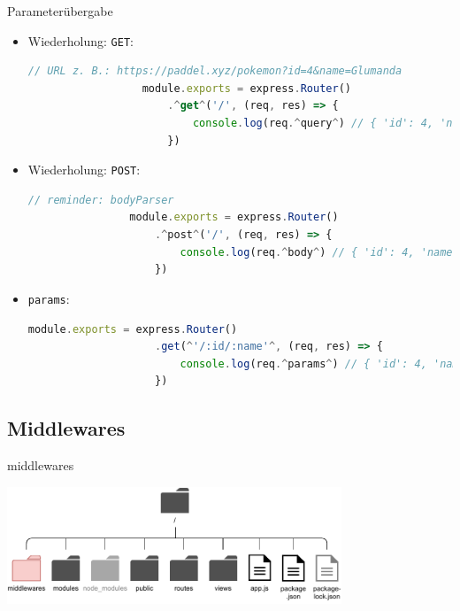 \begin{bonus}{Parameterübergabe}
    \begin{itemize}
        \item Wiederholung: \texttt{GET}:

              \begin{lstlisting}[language=JavaScript]
                  // URL z. B.: https://paddel.xyz/pokemon?id=4&name=Glumanda
                  module.exports = express.Router()
                      .^get^('/', (req, res) => {
                          console.log(req.^query^) // { 'id': 4, 'name': 'Glumanda' }
                      })
              \end{lstlisting}
        \item Wiederholung: \texttt{POST}:

              \begin{lstlisting}[language=JavaScript]
                // reminder: bodyParser
                module.exports = express.Router()
                    .^post^('/', (req, res) => {
                        console.log(req.^body^) // { 'id': 4, 'name': 'Glumanda' }
                    })
            \end{lstlisting}
        \item \texttt{params}:

              \begin{lstlisting}[language=JavaScript]
                module.exports = express.Router()
                    .get(^'/:id/:name'^, (req, res) => {
                        console.log(req.^params^) // { 'id': 4, 'name': 'Glumanda' }
                    })
            \end{lstlisting}
    \end{itemize}
\end{bonus}

\subsection{Middlewares}

\begin{bonus}{middlewares}
    \begin{center}
        \includegraphics[width=0.75\textwidth]{includes/figures/bonus_nodejs_middlewares.pdf}
    \end{center}
\end{bonus}


